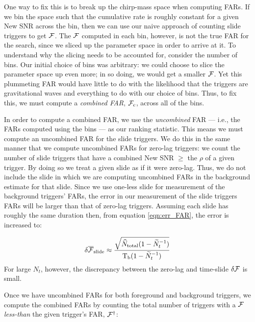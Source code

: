 One way to fix this is to break up the chirp-mass space when computing \acp{FAR}. If we bin the space such that the cumulative rate is roughly constant for a given New \ac{SNR} across the bin, then we can use our naive approach of counting slide triggers to get $\mathcal{F}$. The $\mathcal{F}$ computed in each bin, however, is not the true \ac{FAR} for the search, since we sliced up the parameter space in order to arrive at it. To understand why the slicing needs to be accounted for, consider the number of bins. Our initial choice of bins was arbitrary: we could choose to slice the parameter space up even more; in so doing, we would get a smaller $\mathcal{F}$. Yet this plummeting \ac{FAR} would have little to do with the likelihood that the triggers are gravitational waves and everything to do with our choice of bins. Thus, to fix this, we must compute a \emph{combined \ac{FAR}}, $\mathcal{F}_{\mathrm{c}}$, across all of the bins.

In order to compute a combined \ac{FAR}, we use the \emph{uncombined} \ac{FAR} --- i.e., the \acp{FAR} computed using the bins --- as our ranking statistic. This means we must compute an uncombined \ac{FAR} for the slide triggers. We do this in the same manner that we compute uncombined \acp{FAR} for zero-lag triggers: we count the number of slide triggers that have a combined New \ac{SNR} $\geq$ the $\rho$ of a given trigger. By doing so we treat a given slide as if it were zero-lag. Thus, we do not include the slide in which we are computing uncombined \acp{FAR} in the background estimate for that slide. Since we use one-less slide for measurement of the background triggers' \acp{FAR}, the error in our measurement of the slide triggers \acp{FAR} will be larger than that of zero-lag triggers. Assuming each slide has roughly the same duration then, from equation \ref{eqn:err_FAR}, the error is increased to:

\begin{equation}
\label{eqn:err_FAR_slide}
\delta \overline{\far}_{\mathrm{slide}} \approx \frac{\sqrt{ \widehat{N}_{\mathrm{total}} ( 1 - \widetilde{N}_t^{-1} ) }}{ \Tb (1- \widetilde{N}_t^{-1}) }
\end{equation}
For large $N_t$, however, the discrepancy between the zero-lag and time-slide $\delta \mathcal{F}$ is small. 

Once we have uncombined \acp{FAR} for both foreground and background triggers, we compute the combined \acp{FAR} by counting the total number of triggers with a $\mathcal{F}$ \emph{less-than} the given trigger's \ac{FAR}, $\mathcal{F}^\dagger$:

